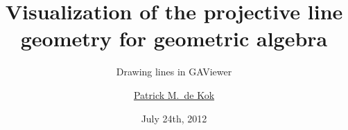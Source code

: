 \documentclass[a4paper,11pt,twoside]{article}
\title{Visualization of the projective line geometry for geometric algebra} %
\subtitle{Drawing lines in GAViewer}
\author{\href{mailto:dhrdekok@gmail.com}{Patrick M.\ de Kok}}
\date{July 24th, 2012}
\begin{document}
\iftoggle{draft}{
\thispagestyle{empty}
\begin{tiny}
\begin{flushright}
Patrick de Kok, 5640318
\end{flushright}
\end{tiny}
  \begin{center}
    \begin{Huge}
      {\color{red} NOTE!}
    \end{Huge}
  \end{center}
  This document contains some notes. Explanation of the notes:
  \begin{itemize}
    \item \colorbox{red}{\bfseries\color{white}Red comments}: directed to the reader in general.  These include questions like how to cite, how something could be rephrased, and questions on spelling.
    \item \colorbox{yellow}{\bfseries Yellow notes}: directed at the supervisor (\makeatletter\@supervisor\makeatother) which are on the subject of the thesis.
    \item \colorbox{niceblue}{\bfseries\color{white}Blue todos}: directed mostly at myself, but might be convenient for the general reader as well.
    \item \colorbox{nicegreen}{\bfseries\color{white}Green boxes}: notes from Evi.
  \end{itemize}

Now let's start off with a question to the reader:

\comment{If putting a reference at the end of a sentence, how should that be done?}
\begin{enumerate}
  \item This is a reference to some article.~\cite{TheBook}
  \item This is a reference to some article~\cite{TheBook}.
\end{enumerate}

And a small caution:

\TODO{Fix figure and table placement.}

\TODO{Replace $X = \plucker{\V{d}}{\V{m}}$ notation with $x = \plucker{\V{x}}{\V{\bar{x}}} = \V{x}\ez + \edual{\V{\bar{x}}}$}

\TODO{Redefine $X = -\plucker{\V{d}}{\V{m}}$ to $X = \plucker{\V{d}}{\V{m}}$, if possible???}

    \setcounter{page}{0}
  \newpage
  \thispagestyle{empty}
  \setcounter{page}{0}
  \hspace{3cm}
  \newpage
}{}
\end{document}
